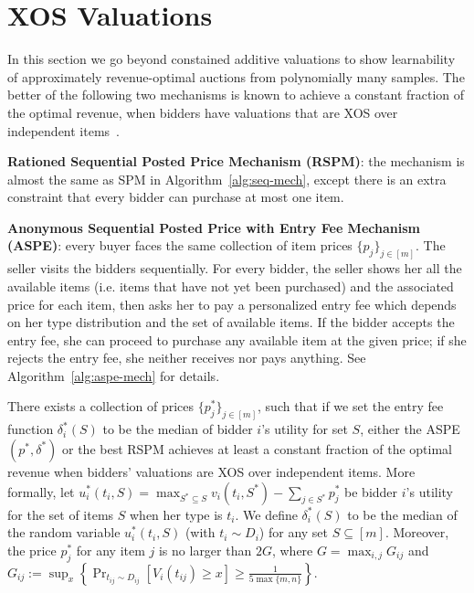 \section{XOS Valuations} \label{sec:constrained additive}
In this section we go beyond constained additive valuations to show learnability of approximately revenue-optimal auctions from polynomially many samples. The better of the following two mechanisms is known to achieve a constant fraction of the optimal revenue, when bidders have valuations that are XOS over independent items~\cite{CaiZ17}.

\vspace{.05in}
\noindent\textbf{Rationed Sequential Posted Price Mechanism (RSPM)}: the mechanism is almost the same as SPM in Algorithm~\ref{alg:seq-mech}, except there is an extra constraint that every bidder can purchase at most one item.

\vspace{.05in}
\noindent\textbf{Anonymous Sequential Posted Price with Entry Fee Mechanism (ASPE)}: every buyer faces the same collection of item prices $\{p_j\}_{j\in[m]}$. The seller visits the bidders sequentially. For every bidder, the seller shows her all the available items (i.e. items that have not yet been purchased) and the associated price for each item, then asks her to pay a personalized entry fee which depends on her type distribution and the set of available items. If the bidder accepts the entry fee, she can proceed to purchase any available item at the given price; if she rejects the entry fee, she neither receives nor pays anything. See Algorithm~\ref{alg:aspe-mech} for details.

\begin{theorem}\cite{CaiZ17}\label{thm:simple XOS}
	There exists a collection of prices $\{p^*_j\}_{j\in[m]}$, such that if we set the entry fee function $\delta^*_i(S)$ to be the median of bidder $i$'s utility for set $S$, either the ASPE$(p^*,\delta^*)$ or the best RSPM achieves at least a constant fraction of the optimal revenue when bidders' valuations are XOS over independent items. More formally, let $u^*_i(t_i, S)=\max_{S^*\subseteq S} v_i(t_i, S^*)-\sum_{j\in S^*} p^*_j$ be bidder $i$'s utility for the set of items $S$ when her type is $t_i$. We define $\delta^*_i(S)$ to be the median of the random variable $u^*_i(t_i,S)$ (with $t_i\sim D_i$) for any set $S\subseteq [m]$.  Moreover, the price $p^*_j$ for any item $j$ is no larger than $2G$, where $G = \max_{i,j} G_{ij}$ and $G_{ij}:= \sup_x \left\{ \Pr_{t_{ij}\sim D_{ij}}\left[V_i(t_{ij})\geq x\right]\geq \frac{1}{5\max\{m,n\}}\right\}$.
\end{theorem}

